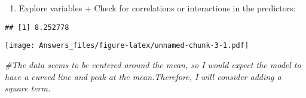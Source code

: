 \documentclass[
]{article}
\newenvironment{Shaded}{\begin{snugshade}}{\end{snugshade}}
\newcommand{\CommentTok}[1]{\textcolor[rgb]{0.56,0.35,0.01}{\textit{#1}}}
\newcommand{\FunctionTok}[1]{\textcolor[rgb]{0.13,0.29,0.53}{\textbf{#1}}}
\newcommand{\NormalTok}[1]{#1}
\newcommand{\OtherTok}[1]{\textcolor[rgb]{0.56,0.35,0.01}{#1}}
\newcommand{\SpecialCharTok}[1]{\textcolor[rgb]{0.81,0.36,0.00}{\textbf{#1}}}
\providecommand{\tightlist}{%
  \setlength{\itemsep}{0pt}\setlength{\parskip}{0pt}}
\begin{document}
\begin{Shaded}
\end{Shaded}

\begin{enumerate}
\def\labelenumi{\arabic{enumi}.}
\setcounter{enumi}{1}
\tightlist
\item
  Explore variables + Check for correlations or interactions in the
  predictors:
\end{enumerate}

\begin{Shaded}
\end{Shaded}

\begin{verbatim}
## [1] 8.252778
\end{verbatim}

\begin{Shaded}
\end{Shaded}

\texttt{[image: Answers\_files/figure-latex/unnamed-chunk-3-1.pdf]}

\begin{Shaded}
\begin{Highlighting}[]
\CommentTok{\#The data seems to be centered around the mean, so I would expect the model to have a curved line and peak at the mean.Therefore, I will consider adding a square term. }
\end{Highlighting}
\end{Shaded}

\begin{Shaded}
\end{Shaded}
\end{document}
